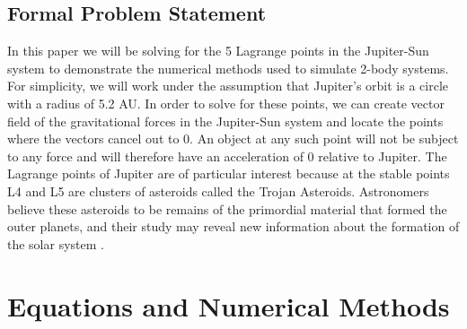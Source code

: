 \documentclass[linenumbers,RNAAS,trackchanges]{aastex631}
\begin{document}
\subsection{\textbf{Formal Problem Statement}}
In this paper we will be solving for the 5 Lagrange points in the Jupiter-Sun system to demonstrate the numerical methods used to simulate 2-body systems. For simplicity, we will work under the assumption that Jupiter's orbit is a circle with a radius of 5.2 AU. In order to solve for these points, we can create vector field of the gravitational forces in the Jupiter-Sun system and locate the points where the vectors cancel out to 0. An object at any such point will not be subject to any force and will therefore have an acceleration of 0 relative to Jupiter. The Lagrange points of Jupiter are of particular interest because at the stable points L4 and L5 are clusters of asteroids called the Trojan Asteroids. Astronomers believe these asteroids to be remains of the primordial material that formed the outer planets, and their study may reveal new information about the formation of the solar system \cite{Garner_2021}.

\vspace{1cm}
\section{\textbf{Equations and Numerical Methods}}
\end{document}

